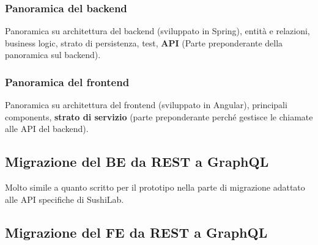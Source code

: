 \subsubsection{Panoramica del backend}
Panoramica su architettura del backend (sviluppato in Spring), entità e relazioni, business logic, strato di persistenza, test, \textbf{API} (Parte preponderante della panoramica sul backend).
\subsubsection{Panoramica del frontend}
Panoramica su architettura del frontend (sviluppato in Angular), principali components, \textbf{strato di servizio} (parte preponderante perché gestisce le chiamate alle API del backend).
\subsection{Migrazione del BE da REST a GraphQL}
Molto simile a quanto scritto per il prototipo nella parte di migrazione adattato alle API specifiche di SushiLab.
\subsection{Migrazione del FE da REST a GraphQL}




